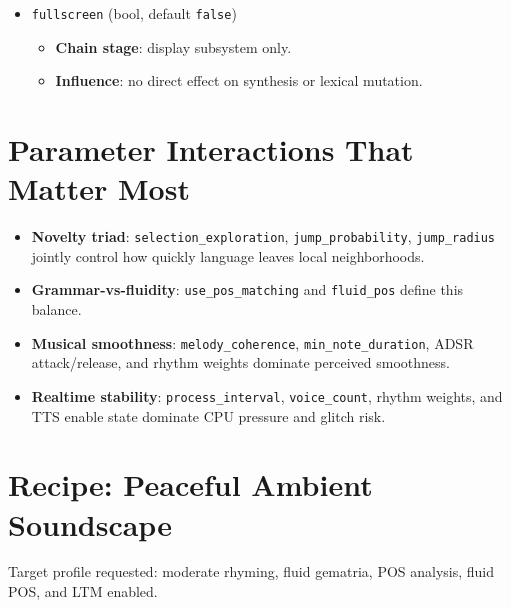 \documentclass[11pt,a4paper]{article}
\begin{document}
\begin{itemize}
  \item \texttt{fullscreen} (bool, default \texttt{false})
  \begin{itemize}
    \item \textbf{Chain stage}: display subsystem only.
    \item \textbf{Influence}: no direct effect on synthesis or lexical mutation.
  \end{itemize}
\end{itemize}

\section{Parameter Interactions That Matter Most}
\begin{itemize}
  \item \textbf{Novelty triad}: \texttt{selection\_exploration}, \texttt{jump\_probability}, \texttt{jump\_radius} jointly control how quickly language leaves local neighborhoods.
  \item \textbf{Grammar-vs-fluidity}: \texttt{use\_pos\_matching} and \texttt{fluid\_pos} define this balance.
  \item \textbf{Musical smoothness}: \texttt{melody\_coherence}, \texttt{min\_note\_duration}, ADSR attack/release, and rhythm weights dominate perceived smoothness.
  \item \textbf{Realtime stability}: \texttt{process\_interval}, \texttt{voice\_count}, rhythm weights, and TTS enable state dominate CPU pressure and glitch risk.
\end{itemize}

\section{Recipe: Peaceful Ambient Soundscape}
Target profile requested: moderate rhyming, fluid gematria, POS analysis, fluid POS, and LTM enabled.
\end{document}
